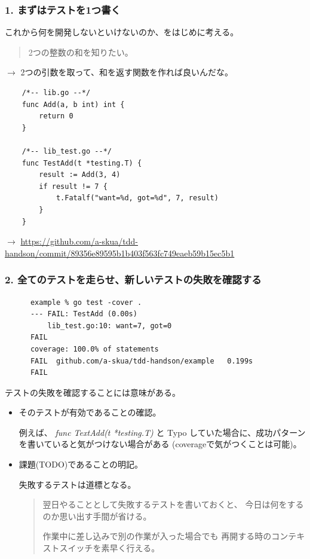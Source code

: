 \documentclass[aspectratio=169]{beamer}
\begin{document}
\begin{frame}[fragile]\frametitle{1. まずはテストを1つ書く}
  これから何を開発しないといけないのか、をはじめに考える。

  \begin{quote}
    \color{blue}
    2つの整数の和を知りたい。
  \end{quote}
  $\rightarrow$ 2つの引数を取って、和を返す関数を作れば良いんだな。

  \scriptsize
  \begin{verbatim}
    /*-- lib.go --*/
    func Add(a, b int) int {
        return 0
    }

    /*-- lib_test.go --*/
    func TestAdd(t *testing.T) {
        result := Add(3, 4)
        if result != 7 {
            t.Fatalf("want=%d, got=%d", 7, result)
        }
    }
  \end{verbatim}

  $\rightarrow$
  \url{https://github.com/a-skua/tdd-handson/commit/89356e89595b1b403f563fc749eaeb59b15ec5b1}
\end{frame}

\begin{frame}[fragile]\frametitle{2. 全てのテストを走らせ、新しいテストの失敗を確認する}
  {
    \scriptsize
    \begin{verbatim}
      example % go test -cover .
      --- FAIL: TestAdd (0.00s)
          lib_test.go:10: want=7, got=0
      FAIL
      coverage: 100.0% of statements
      FAIL	github.com/a-skua/tdd-handson/example	0.199s
      FAIL
    \end{verbatim}
  }

  テストの失敗を確認することには意味がある。
  \begin{itemize}
    \item {\color{blue} そのテストが有効であることの確認。}

      {
        \small
        例えば、\textit{\color{red} func TextAdd(t *testing.T)}
        と Typo していた場合に、成功パターンを書いていると気がつけない場合がある
        (coverageで気がつくことは可能)。
      }
    \item {\color{blue} 課題(TODO)であることの明記。}

      {
        \small
        失敗するテストは道標となる。
        \begin{quote}
          翌日やることとして失敗するテストを書いておくと、
          今日は何をするのか思い出す手間が省ける。

          作業中に差し込みで別の作業が入った場合でも
          再開する時のコンテキストスイッチを素早く行える。
        \end{quote}
      }
  \end{itemize}
\end{frame}
\end{document}
